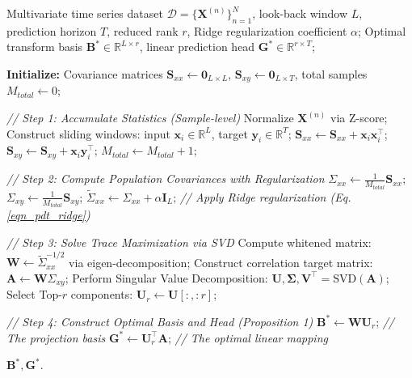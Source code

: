 \documentclass[final,3p,times]{elsarticle}
\begin{document}
\begin{algorithm}[t]
\caption{Computation of Data-Adaptive Predictive Domain Transform Method(PDTM)}
\label{alg:pdt_computation}
    \renewcommand{\algorithmicrequire}{\textbf{Input:}} 
    \renewcommand{\algorithmicensure}{\textbf{Output:}}
    \begin{algorithmic}[1]
        \REQUIRE Multivariate time series dataset $\mathcal{D} = \{\mathbf{X}^{(n)}\}_{n=1}^N$, 
                 look-back window $L$, prediction horizon $T$, 
                 reduced rank $r$, Ridge regularization coefficient $\alpha$;
        \ENSURE Optimal transform basis $\mathbf{B}^* \in \mathbb{R}^{L \times r}$, 
                linear prediction head $\mathbf{G}^* \in \mathbb{R}^{r \times T}$;
        
        \STATE \textbf{Initialize:} Covariance matrices $\mathbf{S}_{xx} \leftarrow \mathbf{0}_{L \times L}$, $\mathbf{S}_{xy} \leftarrow \mathbf{0}_{L \times T}$, total samples $M_{total} \leftarrow 0$;
        
        \STATE \textit{// Step 1: Accumulate Statistics (Sample-level)}
            \STATE Normalize $\mathbf{X}^{(n)}$ via Z-score;
            \STATE Construct sliding windows: input $\mathbf{x}_i \in \mathbb{R}^L$, target $\mathbf{y}_i \in \mathbb{R}^T$;
                \STATE $\mathbf{S}_{xx} \leftarrow \mathbf{S}_{xx} + \mathbf{x}_i \mathbf{x}_i^\top$;
                \STATE $\mathbf{S}_{xy} \leftarrow \mathbf{S}_{xy} + \mathbf{x}_i \mathbf{y}_i^\top$;
                \STATE $M_{total} \leftarrow M_{total} + 1$;
            \ENDFOR
        \ENDFOR
        
        \STATE \textit{// Step 2: Compute Population Covariances with Regularization}
        \STATE $\Sigma_{xx} \leftarrow \frac{1}{M_{total}} \mathbf{S}_{xx}$; \quad $\Sigma_{xy} \leftarrow \frac{1}{M_{total}} \mathbf{S}_{xy}$;
        \STATE $\tilde{\Sigma}_{xx} \leftarrow \Sigma_{xx} + \alpha \mathbf{I}_L$; \quad \textit{// Apply Ridge regularization (Eq. \ref{eqn_pdt_ridge})}
        
        \STATE \textit{// Step 3: Solve Trace Maximization via SVD}
        \STATE Compute whitened matrix: $\mathbf{W} \leftarrow \tilde{\Sigma}_{xx}^{-1/2}$ via eigen-decomposition;
        \STATE Construct correlation target matrix: $\mathbf{A} \leftarrow \mathbf{W} \Sigma_{xy}$;
        \STATE Perform Singular Value Decomposition: $\mathbf{U}, \mathbf{\Sigma}, \mathbf{V}^\top = \text{SVD}(\mathbf{A})$;
        \STATE Select Top-$r$ components: $\mathbf{U}_r \leftarrow \mathbf{U}[:, :r]$;
        
        \STATE \textit{// Step 4: Construct Optimal Basis and Head (Proposition 1)}
        \STATE $\mathbf{B}^* \leftarrow \mathbf{W} \mathbf{U}_r$; \quad \textit{// The projection basis}
        \STATE $\mathbf{G}^* \leftarrow \mathbf{U}_r^\top \mathbf{A}$; \quad \textit{// The optimal linear mapping}
        
        \RETURN $\mathbf{B}^*, \mathbf{G}^*$.
    \end{algorithmic}
\end{algorithm}
\end{document}

